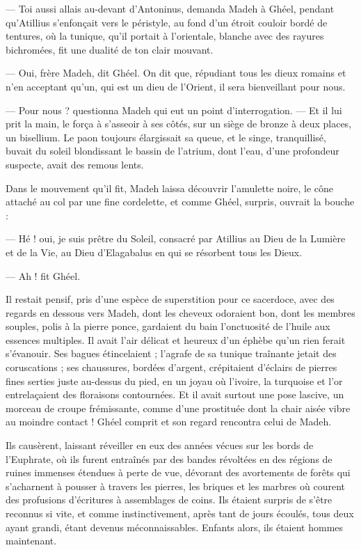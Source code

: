 \documentclass[a4paper, 11pt, oneside, polutonikogreek, french]{article}
\begin{document}
--- Toi aussi allais au-devant d'Antoninus, demanda Madeh à Ghéel, pendant qu'Atillius s'enfonçait vers le péristyle, au fond d'un étroit couloir bordé de tentures, où la tunique, qu'il portait à l'orientale, blanche avec des rayures bichromées, fit une dualité de ton clair mouvant.

--- Oui, frère Madeh, dit Ghéel. On dit que, répudiant tous les dieux romains et n'en acceptant qu'un, qui est un dieu de l'Orient, il sera bienveillant pour nous.

--- Pour nous ? questionna Madeh qui eut un point d'interrogation. --- Et il lui prit la main, le força à s'asseoir à ses côtés, sur un siège de bronze à deux places, un bisellium. Le paon toujours élargissait sa queue, et le singe, tranquillisé, buvait du soleil blondissant le bassin de l'atrium, dont l'eau, d'une profondeur suspecte, avait des remous lents.

Dans le mouvement qu'il fit, Madeh laissa découvrir l'amulette noire, le cône attaché au col par une fine cordelette, et comme Ghéel, surpris, ouvrait la bouche :

--- Hé ! oui, je suis prêtre du Soleil, consacré par Atillius au Dieu de la Lumière et de la Vie, au Dieu d'Elagabalus en qui se résorbent tous les Dieux.

--- Ah ! fit Ghéel.

Il restait pensif, pris d'une espèce de superstition pour ce sacerdoce, avec des regards en dessous vers Madeh, dont les cheveux odoraient bon, dont les membres souples, polis à la pierre ponce, gardaient du bain l'onctuosité de l'huile aux essences multiples. Il avait l'air délicat et heureux d'un éphèbe qu'un rien ferait s'évanouir. Ses bagues étincelaient ; l'agrafe de sa tunique traînante jetait des coruscations ; ses chaussures, bordées d'argent, crépitaient d'éclairs de pierres fines serties juste au-dessus du pied, en un joyau où l'ivoire, la turquoise et l'or entrelaçaient des floraisons contournées. Et il avait surtout une pose lascive, un morceau de croupe frémissante, comme d'une prostituée dont la chair aisée vibre au moindre contact ! Ghéel comprit et son regard rencontra celui de Madeh.

Ils causèrent, laissant réveiller en eux des années vécues sur les bords de l'Euphrate, où ils furent entraînés par des bandes révoltées en des régions de ruines immenses étendues à perte de vue, dévorant des avortements de forêts qui s'acharnent à pousser à travers les pierres, les briques et les marbres où courent des profusions d'écritures à assemblages de coins. Ils étaient surpris de s'être reconnus si vite, et comme instinctivement, après tant de jours écoulés, tous deux ayant grandi, étant devenus méconnaissables. Enfants alors, ils étaient hommes maintenant.
\end{document}
